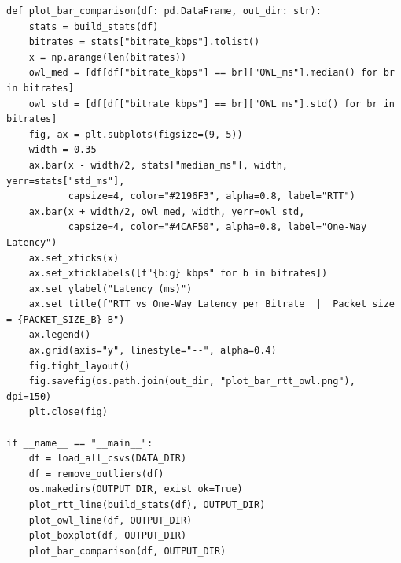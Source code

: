 \begin{lstlisting}[style=appendix-py, caption={Latency vs.\ bitrate plotting}, label={lst:latency-bitrate-plot}]
def plot_bar_comparison(df: pd.DataFrame, out_dir: str):
    stats = build_stats(df)
    bitrates = stats["bitrate_kbps"].tolist()
    x = np.arange(len(bitrates))
    owl_med = [df[df["bitrate_kbps"] == br]["OWL_ms"].median() for br in bitrates]
    owl_std = [df[df["bitrate_kbps"] == br]["OWL_ms"].std() for br in bitrates]
    fig, ax = plt.subplots(figsize=(9, 5))
    width = 0.35
    ax.bar(x - width/2, stats["median_ms"], width, yerr=stats["std_ms"],
           capsize=4, color="#2196F3", alpha=0.8, label="RTT")
    ax.bar(x + width/2, owl_med, width, yerr=owl_std,
           capsize=4, color="#4CAF50", alpha=0.8, label="One-Way Latency")
    ax.set_xticks(x)
    ax.set_xticklabels([f"{b:g} kbps" for b in bitrates])
    ax.set_ylabel("Latency (ms)")
    ax.set_title(f"RTT vs One-Way Latency per Bitrate  |  Packet size = {PACKET_SIZE_B} B")
    ax.legend()
    ax.grid(axis="y", linestyle="--", alpha=0.4)
    fig.tight_layout()
    fig.savefig(os.path.join(out_dir, "plot_bar_rtt_owl.png"), dpi=150)
    plt.close(fig)

if __name__ == "__main__":
    df = load_all_csvs(DATA_DIR)
    df = remove_outliers(df)
    os.makedirs(OUTPUT_DIR, exist_ok=True)
    plot_rtt_line(build_stats(df), OUTPUT_DIR)
    plot_owl_line(df, OUTPUT_DIR)
    plot_boxplot(df, OUTPUT_DIR)
    plot_bar_comparison(df, OUTPUT_DIR)
\end{lstlisting}

